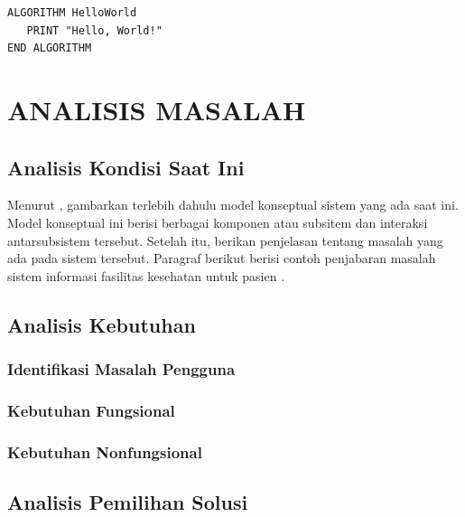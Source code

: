 \documentclass[12pt,a4paper,oneside]{book}
\begin{document}
\begin{lstlisting}[frame=lines, caption={Contoh pseudocode}, label={alg:contoh1}]
ALGORITHM HelloWorld
   PRINT "Hello, World!"
END ALGORITHM
\end{lstlisting}




\chapter{ANALISIS MASALAH}
\section{Analisis Kondisi Saat Ini}
Menurut \textcite{laudon2020}, gambarkan terlebih dahulu model konseptual sistem yang ada saat ini. Model konseptual ini berisi berbagai komponen atau subsitem dan interaksi antarsubsistem tersebut. Setelah itu, berikan penjelasan tentang masalah yang ada pada sistem tersebut. Paragraf berikut berisi contoh penjabaran masalah sistem informasi fasilitas kesehatan untuk pasien \autocite{pressman2019}. 
\section{Analisis Kebutuhan}
\lipsum[4]
\subsection{Identifikasi Masalah Pengguna}
\lipsum[5]
\subsection{Kebutuhan Fungsional}
\lipsum[6]
\subsection{Kebutuhan Nonfungsional}
\lipsum[7]

\section{Analisis Pemilihan Solusi}
\end{document}
